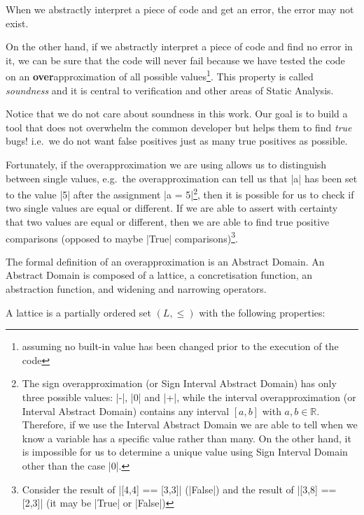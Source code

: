 When we abstractly interpret a piece of code and get an error, the error
may not exist.

On the other hand, if we abstractly interpret a piece of code and find
no error in it, we can be sure that the code will never fail because we
have tested the code on an \textbf{over}approximation of all possible
values\footnote{assuming no built-in value has been changed prior to the
  execution of the code}. This property is called \emph{soundness} and
it is central to verification and other areas of Static Analysis.

Notice that we do not care about soundness in this work. Our goal is to
build a tool that does not overwhelm the common developer but helps them
to find \emph{true} bugs! i.e.~we do not want false positives just as
many true positives as possible.

Fortunately, if the overapproximation we are using allows us to
distinguish between single values, e.g.~the overapproximation can tell
us that \pycode|a| has been set to the value \pycode|5| after the
assignment \pycode|a = 5|\footnote{The sign overapproximation (or
  Sign Interval Abstract Domain) has only three possible values:
  \pycode|-|, \pycode|0| and \pycode|+|, while the interval
  overapproximation (or Interval Abstract Domain) contains any interval
  \([a,b]\) with \(a,b \in \mathbb{R}\). Therefore, if we use the
  Interval Abstract Domain we are able to tell when we know a variable
  has a specific value rather than many. On the other hand, it is
  impossible for us to determine a unique value using Sign Interval
  Domain other than the case \pycode|0|.}, then it is possible for us to
check if two single values are equal or different. If we are able to
assert with certainty that two values are equal or different, then we
are able to find true positive comparisons (opposed to maybe
\pycode|True| comparisons)\footnote{Consider the result of
  \pycode|[4,4] == [3,3]| (\pycode|False|) and the result of
  \pycode|[3,8] == [2,3]| (it may be \pycode|True| or
  \pycode|False|)}.

The formal definition of an overapproximation is an Abstract Domain. An Abstract Domain is
composed of a lattice, a concretisation function, an abstraction function,
 and widening and narrowing operators.

A lattice is a partially ordered set \((L, \le)\) with the following properties:


